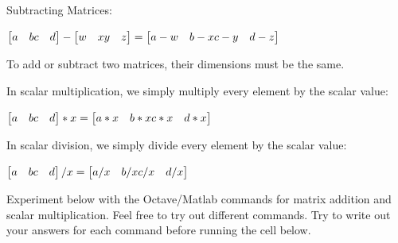 \documentclass[
]{article}
\begin{document}
Subtracting Matrices:

\(\begin{bmatrix} a & b \newline c & d \newline \end{bmatrix} - \begin{bmatrix} w & x \newline y & z \newline \end{bmatrix} =\begin{bmatrix} a-w & b-x \newline c-y & d-z \newline \end{bmatrix}\)

To add or subtract two matrices, their dimensions must be the same.

In scalar multiplication, we simply multiply every element by the scalar
value:

\(\begin{bmatrix} a & b \newline c & d \newline \end{bmatrix} * x =\begin{bmatrix} a*x & b*x \newline c*x & d*x \newline \end{bmatrix}\)

In scalar division, we simply divide every element by the scalar value:

\(\begin{bmatrix} a & b \newline c & d \newline \end{bmatrix} / x =\begin{bmatrix} a /x & b/x \newline c /x & d /x \newline \end{bmatrix}\)

Experiment below with the Octave/Matlab commands for matrix addition and
scalar multiplication. Feel free to try out different commands. Try to
write out your answers for each command before running the cell below.
\end{document}

